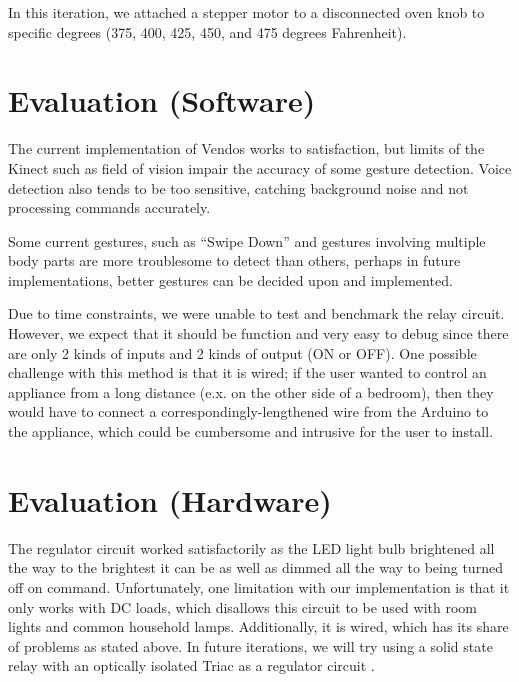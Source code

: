 \documentclass{chi-ext}
\begin{document}
In this iteration, we attached a stepper motor to a disconnected oven knob to specific degrees (375, 400, 425, 450, and 475 degrees Fahrenheit). 


\section{Evaluation (Software)}

The current implementation of Vendos works to satisfaction, but limits of the Kinect such as field of vision impair the accuracy of some gesture detection.
Voice detection also tends to be too sensitive, catching background noise and not processing commands accurately.
 
Some current gestures, such as “Swipe Down” and gestures involving multiple body parts are more troublesome to detect than others, perhaps in future implementations, better gestures can be decided upon and implemented.

Due to time constraints, we were unable to test and benchmark the relay circuit.
However, we expect that it should be function and very easy to debug since there are only 2 kinds of inputs and 2 kinds of output (ON or OFF).
One possible challenge with this method is that it is wired; if the user wanted to control an appliance from a long distance (e.x. on the other side of a bedroom), then they would have to connect a correspondingly-lengthened wire from the Arduino to the appliance, which could be cumbersome and intrusive for the user to install.

\section{Evaluation (Hardware)}

The regulator circuit worked satisfactorily as the LED light bulb brightened all the way to the brightest it can be as well as dimmed all the way to being turned off on command.
Unfortunately, one limitation with our implementation is that it only works with DC loads, which disallows this circuit to be used with room lights and common household lamps.
Additionally, it is wired, which has its share of problems as stated above.
In future iterations, we will try using a solid state relay with an optically isolated Triac as a regulator circuit \cite{_arduino_lights}.
\end{document}
